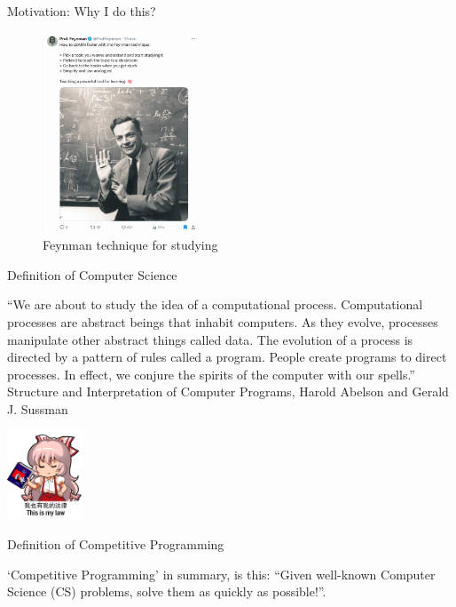 \documentclass[ignorenonframetext,]{beamer}
\begin{document}
\begin{frame}{Motivation: Why I do this?}
\protect\hypertarget{motivation-why-i-do-this}{}

\begin{figure}
\centering
\includegraphics[width=\textwidth,height=2.34375in]{feynman-technique.png}
\caption{Feynman technique for studying}
\end{figure}

\end{frame}

\begin{frame}{Definition of Computer Science}
\protect\hypertarget{definition-of-computer-science}{}

``We are about to study the idea of a computational process.
Computational processes are abstract beings that inhabit computers. As
they evolve, processes manipulate other abstract things called data. The
evolution of a process is directed by a pattern of rules called a
program. People create programs to direct processes. In effect, we
conjure the spirits of the computer with our spells.'' Structure and
Interpretation of Computer Programs, Harold Abelson and Gerald J.
Sussman

\includegraphics[width=\textwidth,height=1.04167in]{Fujiwara_No_Mokou_Law_Is_SICP.png}

\end{frame}

\begin{frame}{Definition of Competitive Programming}
\protect\hypertarget{definition-of-competitive-programming}{}

`Competitive Programming' in summary, is this: ``Given well-known
Computer Science (CS) problems, solve them as quickly as possible!''.

\end{frame}
\end{document}

